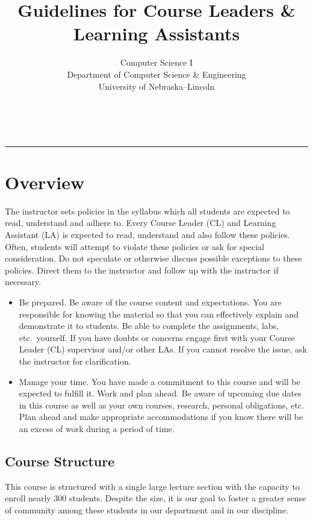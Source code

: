 \documentclass[12pt]{scrartcl}
\title{Guidelines for Course Leaders \& Learning Assistants}\let\Title\@title
\subtitle{Computer Science I\\
{\small
\vskip1cm
Department of Computer Science \& Engineering \\
University of Nebraska--Lincoln}
\vskip-3cm}
\date{~}
\begin{document}
\maketitle


\hrule

\section*{Overview}

The instructor sets policies in the syllabus which all students 
are expected to read, understand and adhere to. Every Course Leader
(CL) and Learning Assistant (LA) is expected 
to read, understand and also follow these policies.  Often, 
students will attempt to violate these policies or ask for special 
consideration.  Do not speculate or otherwise discuss possible 
exceptions to these policies.  Direct them to the instructor 
and follow up with the instructor if necessary.

\begin{itemize}
  \item Be prepared.  Be aware of the course content and expectations.
  You are responsible for knowing the material so that you can effectively
  explain and demonstrate it to students.  Be able to complete the assignments, 
  labs, etc.\ yourself.  If you have doubts or concerns engage first with
  your Course Leader (CL) supervisor and/or other LAs.  If you cannot
  resolve the issue, ask the instructor for clarification.
  \item Manage your time.  You have made a commitment to this course and
  will be expected to fulfill it.  Work and plan ahead.  Be aware of 
  upcoming due dates in this course as well as your own courses, research, 
  personal obligations, etc.  Plan ahead and make appropriate accommodations 
  if you know there will be an excess of work during a period of time.
\end{itemize}

\subsection*{Course Structure}

This course is structured with a single large lecture section with the
capacity to enroll nearly 300 students.  Despite the size, it is our 
goal to foster a greater sense of community among these students in 
our department and in our discipline.  
\end{document}
